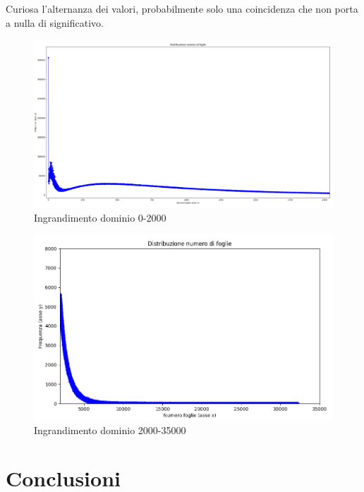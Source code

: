 \documentclass[a4paper,12pt]{report} %
\begin{document}
Curiosa l'alternanza dei valori, probabilmente solo una coincidenza che non porta a nulla di significativo.

\begin{figure}[h!]
    \centering
    \includegraphics[width=1\textwidth]{imgs/grafico_0_2000.png} %
    \caption{Ingrandimento dominio 0-2000}
    \label{fig:etichetta}
\end{figure}

\begin{figure}[h!]
    \centering
    \includegraphics[width=1\textwidth]{imgs/grafico_2000_35000.png} %
    \caption{Ingrandimento dominio 2000-35000}
    \label{fig:etichetta}
\end{figure}




\chapter{Conclusioni}
\end{document}
